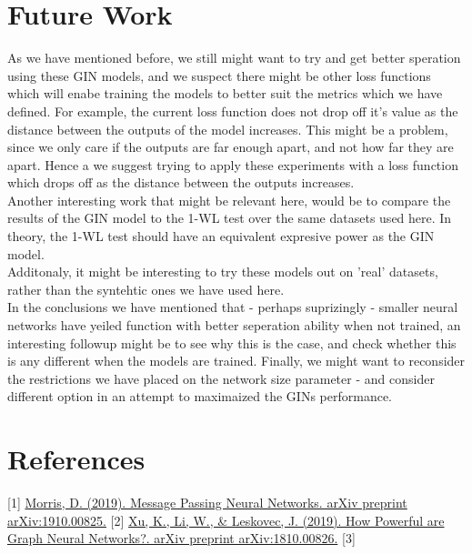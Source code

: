 \documentclass{article}
\begin{document}
\part*{Future Work}
As we have mentioned before, we still might want to try and get better speration using these GIN models,
and we suspect there might be other loss functions which will enabe training the models to better suit
the metrics which we have defined. For example, the current loss function does not drop off it's value
as the distance between the outputs of the model increases. This might be a problem, since we
only care if the outputs are far enough apart, and not how far they are apart. Hence a we suggest trying to
apply these experiments with a loss function which drops off as the distance between the outputs increases.\\
Another interesting work that might be relevant here, would be to compare the results of the GIN model to
the 1-WL test over the same datasets used here. In theory, the 1-WL test should have an equivalent expresive power as
the GIN model.\\
Additonaly, it might be interesting to try these models out on 'real' datasets,
rather than the syntehtic ones we have used here. \\
In the conclusions we have mentioned that - perhaps suprizingly - smaller neural networks have yeiled function with better seperation ability when not trained,
an interesting followup might be to see why this is the case, and check whether this is any different when the models are trained.
Finally, we might want to reconsider the restrictions we have placed on the network size parameter - and consider different option
in an attempt to maximaized the GINs performance.

\part*{References}
[1] \href{https://arxiv.org/abs/2202.00645}{Morris, D. (2019). Message Passing Neural Networks. arXiv preprint arXiv:1910.00825.}
[2] \href{https://arxiv.org/abs/2202.00645}{Xu, K., Li, W., \& Leskovec, J. (2019). How Powerful are Graph Neural Networks?. arXiv preprint arXiv:1810.00826.}
[3] 
\end{document}
